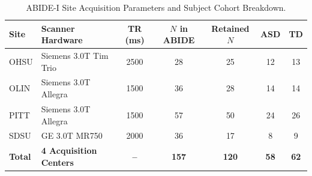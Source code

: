 \begin{table}[h]
\centering
\caption{ABIDE-I Site Acquisition Parameters and Subject Cohort Breakdown.}
\label{tab:site_parameters}
\footnotesize
\setlength{\tabcolsep}{3.5pt}
\begin{tabular}{llccccc}
\toprule
\textbf{Site} & \textbf{Scanner Hardware} & \textbf{TR (ms)} & \textbf{$N$ in ABIDE} & \textbf{Retained $N$} & \textbf{ASD} & \textbf{TD} \\
\midrule
OHSU & Siemens 3.0T Tim Trio & 2500 & 28 & 25 & 12 & 13 \\
OLIN & Siemens 3.0T Allegra  & 1500 & 36 & 28 & 14 & 14 \\
PITT & Siemens 3.0T Allegra  & 1500 & 57 & 50 & 24 & 26 \\
SDSU & GE 3.0T MR750         & 2000 & 36 & 17 & 8  & 9  \\
\midrule
\textbf{Total} & \textbf{4 Acquisition Centers} & \textbf{--} & \textbf{157} & \textbf{120} & \textbf{58} & \textbf{62} \\
\bottomrule
\end{tabular}
\end{table}
